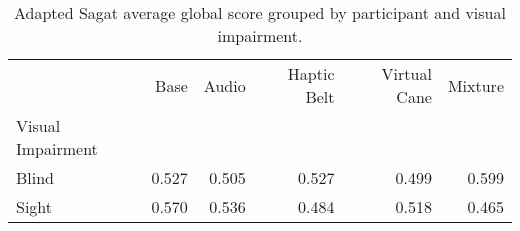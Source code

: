 
\begin{table}[!htb]
\centering
\caption{Adapted Sagat average global score grouped by participant and visual impairment.}
\label{tab:sagat_average_group}
\begin{tabular}{lrrrrr}
\toprule
{} &  Base &  Audio &  Haptic Belt &  Virtual Cane &  Mixture \\
Visual Impairment &       &        &              &               &          \\
\midrule
Blind             & 0.527 &  0.505 &        0.527 &         0.499 &    0.599 \\
Sight             & 0.570 &  0.536 &        0.484 &         0.518 &    0.465 \\
\bottomrule
\end{tabular}
\end{table}

